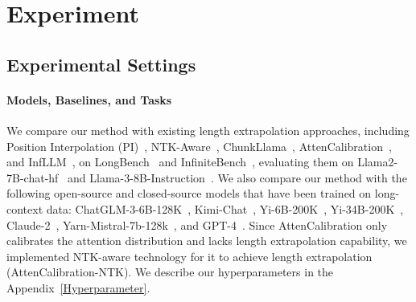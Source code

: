 






\section{Experiment}
\label{experiment}
\subsection{Experimental Settings}
\vspace{-1mm}
\paragraph{Models, Baselines, and Tasks}

We compare our method with existing length extrapolation approaches, including Position Interpolation (PI)~\citep{chen2023extending}, NTK-Aware~\citep{fixedNTK}, ChunkLlama~\citep{an2024training}, AttenCalibration~\citep{yu2024unveiling}, and InfLLM~\citep{xiao2024infllm}, on LongBench~\citep{bai2023longbench} and InfiniteBench~\citep{zhang2024bench}, evaluating them on Llama2-7B-chat-hf~\citep{touvron2023llama} and Llama-3-8B-Instruction~\citep{meta2024llama3}. We also compare our method with the following open-source and closed-source models that have been trained on long-context data: ChatGLM-3-6B-128K~\citep{glm2024chatglm}, Kimi-Chat~\citep{moonshot2023}, Yi-6B-200K~\citep{01ai2023a}, Yi-34B-200K~\citep{01ai2023b}, Claude-2~\citep{anthropic2023}, Yarn-Mistral-7b-128k~\citep{peng2023yarn}, and GPT-4~\citep{achiam2023gpt}. Since AttenCalibration only calibrates the attention distribution and lacks length extrapolation capability, we implemented NTK-aware technology for it to achieve length extrapolation (AttenCalibration-NTK). We describe our hyperparameters in the Appendix~\ref{Hyperparameter}.








